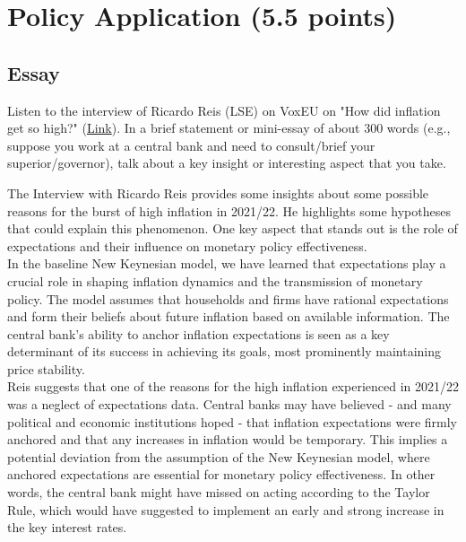 \documentclass[a4paper,11pt]{article}
\begin{document}
\section{Policy Application (5.5 points)}
\begin{qbox}{\subsection{Essay}}
Listen to the interview of Ricardo Reis (LSE) on VoxEU on "How did inflation get so high?" (\href{https://cepr.org/multimedia/how-did-inflation-get-so-high}{Link}). In a brief statement or mini-essay of about 300 words (e.g., suppose you work at a central bank and need to consult/brief your superior/governor), talk about a key insight or interesting aspect that you take.
\end{qbox}

The Interview with Ricardo Reis provides some insights about some possible reasons for the burst of high inflation in 2021/22. He highlights some hypotheses that could explain this phenomenon. One key aspect that stands out is the role of expectations and their influence on monetary policy effectiveness. \\

In the baseline New Keynesian model, we have learned that expectations play a crucial role in shaping inflation dynamics and the transmission of monetary policy. The model assumes that households and firms have rational expectations and form their beliefs about future inflation based on available information. The central bank’s ability to anchor inflation expectations is seen as a key determinant of its success in achieving its goals, most prominently maintaining price stability. \\

Reis suggests that one of the reasons for the high inflation experienced in 2021/22 was a neglect of expectations data. Central banks may have believed - and many political and economic institutions hoped - that inflation expectations were firmly anchored and that any increases in inflation would be temporary. This implies a potential deviation from the assumption of the New Keynesian model, where anchored expectations are essential for monetary policy effectiveness. In other words, the central bank might have missed on acting according to the Taylor Rule, which would have suggested to implement an early and strong increase in the key interest rates.\\
\end{document}
